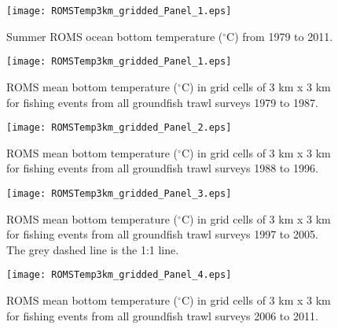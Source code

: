 \documentclass[11pt]{book}\usepackage[]{graphicx}\usepackage[]{color}
\begin{document}

\graphicspath{ {c:/GitHub/SPERA-Maps/Results/Figures/} }
\begin{figure}[!htp]
\begin{center}
\texttt{[image: ROMSTemp3km\_gridded\_Panel\_1.eps]}
\end{center}
\vspace{0mm}
\caption{Summer ROMS ocean bottom temperature ($^\circ$C) from 1979 to 2011.}
\label{fig:roms.ann.temp}
\end{figure} 

\begin{figure}[!htp]
\begin{center}
\texttt{[image: ROMSTemp3km\_gridded\_Panel\_1.eps]}
\end{center}

\caption{ROMS mean bottom temperature ($^\circ$C) in grid cells of 3 km x 3 km for fishing events from all groundfish trawl surveys 1979 to 1987.}
\label{fig:ROMStemp79to87}
\end{figure}

\newpage

\begin{figure}[!htp]
\ContinuedFloat
\begin{center}
\texttt{[image: ROMSTemp3km\_gridded\_Panel\_2.eps]}
\end{center}

\caption{ROMS mean bottom temperature ($^\circ$C) in grid cells of 3 km x 3 km for fishing events from all groundfish trawl surveys 1988 to 1996.}
\label{fig:ROMStemp88to96}
\end{figure}   

\newpage

\begin{figure}[!htp]
\ContinuedFloat
\begin{center}
\texttt{[image: ROMSTemp3km\_gridded\_Panel\_3.eps]}
\end{center}

\caption{ROMS mean bottom temperature ($^\circ$C) in grid cells of 3 km x 3 km for fishing events from all groundfish trawl surveys 1997 to 2005. The grey dashed line is the 1:1 line.}
\label{fig:ROMStemp97to05}
\end{figure}   

\newpage

\begin{figure}[!htp]
\ContinuedFloat
\begin{center}
\texttt{[image: ROMSTemp3km\_gridded\_Panel\_4.eps]}
\end{center}

\caption{ROMS mean bottom temperature ($^\circ$C) in grid cells of 3 km x 3 km for fishing events from all groundfish trawl surveys 2006 to 2011.}
\label{fig:ROMStemp06to11}
\end{figure}
\end{document}
